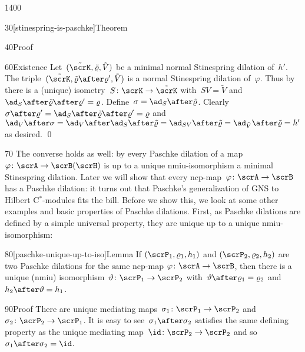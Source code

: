 \begin{parsec}{1400}
\begin{point}{30}[stinespring-is-paschke]{Theorem}
\begin{point}{40}{Proof}
\begin{point}{60}{Existence}%
Let~$(\tilde\scrK, \tilde\varrho, \tilde V)$
be a minimal normal Stinespring dilation of~$h'$.
The triple~$(\tilde\scrK, \tilde\varrho \after \varrho', \tilde V)$
is a normal Stinespring dilation of~$\varphi$.
Thus by 
    there is a (unique) isometry~$S \colon \scrK \to \tilde\scrK$
    with~$SV = \tilde V$
    and~$\ad_S \after \tilde\varrho \after \varrho' = \varrho$.
Define~$\sigma = \ad_S \after \tilde\varrho$.
Clearly~$\sigma \after \varrho' = \ad_S \after \tilde\varrho \after \varrho'
    = \varrho$
    and~$\ad_V \after \sigma =
        \ad_V \after \ad_S \after \tilde\varrho
        = \ad_{SV} \after \tilde\varrho
        = \ad_{\tilde V} \after \tilde\varrho = h'$
        as desired. \qed
\end{point}
\par
\end{point}
\spacingfix{}
\begin{point}{70}%
The converse holds as well:
    by 
    every Paschke dilation of a map~$\varphi \colon \scrA \to \scrB(\scrH)$
    is up to a unique nmiu-isomorphism a minimal Stinespring dilation.
Later we will show that
    every ncp-map~$\varphi\colon \scrA \to \scrB$
    has a Paschke dilation:
    it turns out that Paschke's generalization of
    GNS to Hilbert C$^*$-modules fits the bill.
Before we show this,
    we look at some other examples and basic properties
        of Paschke dilations.
First, as Paschke dilations are defined by a simple universal property,
    they are unique up to a unique nmiu-isomorphism:
\par
\end{point}
\end{point}
\spacingfix{}
\begin{point}{80}[paschke-unique-up-to-iso]{Lemma}%
If $(\scrP_1, \varrho_1, h_1)$
and $(\scrP_2, \varrho_2, h_2)$
    are two Paschke dilations for 
    the same ncp-map $\varphi\colon \scrA \to \scrB$,
    then there is a unique (nmiu)
    isomorphism~$\vartheta \colon \scrP_1 \to \scrP_2$
    with~$\vartheta \after \varrho_1 = \varrho_2$
    and~$h_2 \after \vartheta = h_1$.
\begin{point}{90}{Proof}%
There are unique mediating maps~$\sigma_1\colon \scrP_1 \to \scrP_2$
and~$\sigma_2 \colon \scrP_2 \to \scrP_1$.
It is easy to see~$\sigma_1 \after \sigma_2$
satisfies the same defining property
as the unique mediating map~$\id\colon \scrP_2 \to \scrP_2$
and so~$\sigma_1 \after \sigma_2 = \id$.

\end{point}
\end{point}
\end{parsec}
